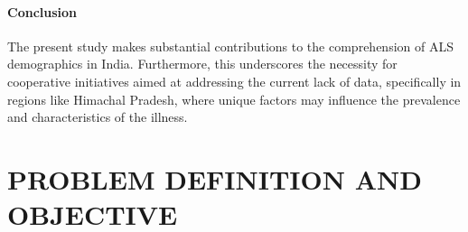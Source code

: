 \documentclass[ 12pt,a4paper,twocolumn,fleqn]{report}
\begin{document}
\subsubsection{Conclusion}
\vspace{2mm}
The present study makes substantial contributions to the comprehension of ALS demographics in India. Furthermore, this underscores the necessity for cooperative initiatives aimed at addressing the current lack of data, specifically in regions like Himachal Pradesh, where unique factors may influence the prevalence and characteristics of the illness.



\newpage
  \pagestyle{fancy}
\thisfancypage{%
  \setlength{\fboxsep}{20pt}\doublebox}{}
\normalsize
\chapter{PROBLEM DEFINITION AND OBJECTIVE}
\end{document}
